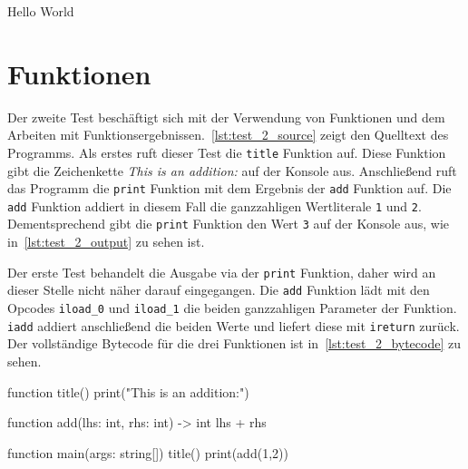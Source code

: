 
\begin{ToyaCode}[numbers=none, caption={Konsolen-Ausgabe des Hello World Programms},label=lst:test_1_output]
Hello World    
\end{ToyaCode}

\section{Funktionen}

Der zweite Test beschäftigt sich mit der Verwendung von Funktionen und dem Arbeiten mit Funktionsergebnissen.~\autoref{lst:test_2_source} zeigt den Quelltext des Programms. Als erstes ruft dieser Test die \texttt{title} Funktion auf. Diese Funktion gibt die Zeichenkette \textit{This is an addition:} auf der Konsole aus. Anschließend ruft das Programm die \texttt{print} Funktion mit dem Ergebnis der \texttt{add} Funktion auf. Die \texttt{add} Funktion addiert in diesem Fall die ganzzahligen Wertliterale \texttt{1} und \texttt{2}. Dementsprechend gibt die \texttt{print} Funktion den Wert \texttt{3} auf der Konsole aus, wie in~\autoref{lst:test_2_output} zu sehen ist.

Der erste Test behandelt die Ausgabe via der \texttt{print} Funktion, daher wird an dieser Stelle nicht näher darauf eingegangen. Die \texttt{add} Funktion lädt mit den Opcodes \texttt{iload\_0} und \texttt{iload\_1} die beiden ganzzahligen Parameter der Funktion. \texttt{iadd} addiert anschließend die beiden Werte und liefert diese mit \texttt{ireturn} zurück. Der vollständige Bytecode für die drei Funktionen ist in~\autoref{lst:test_2_bytecode} zu sehen.

\begin{ToyaCode}[numbers=none, caption={Funktionen},label=lst:test_2_source]
function title() {
    print("This is an addition:")
}

function add(lhs: int, rhs: int) -> int {
    lhs + rhs
}

function main(args: string[]) {
    title()
    print(add(1,2))
}
\end{ToyaCode}  


